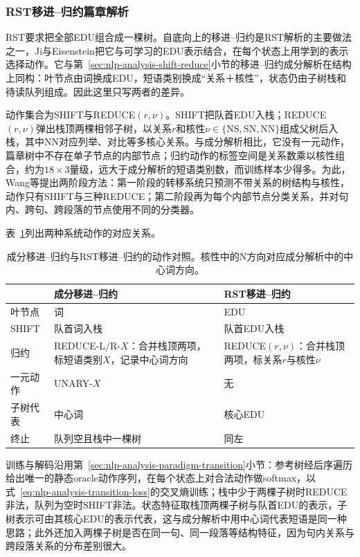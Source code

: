\subsubsection{RST移进--归约篇章解析}
\label{sec:nlp-analysis-rst-transition}

RST要求把全部EDU组合成一棵树。自底向上的移进--归约是RST解析的主要做法之一，Ji与Eisenstein把它与可学习的EDU表示结合，在每个状态上用学到的表示选择动作。它与第~\ref{sec:nlp-analysis-shift-reduce}小节的移进--归约成分解析在结构上同构：叶节点由词换成EDU，短语类别换成“关系＋核性”，状态仍由子树栈和待读队列组成。因此这里只写两者的差异。

动作集合为SHIFT与REDUCE$(r,\nu)$。SHIFT把队首EDU入栈；REDUCE$(r,\nu)$弹出栈顶两棵相邻子树，以关系$r$和核性$\nu\in\{\mathrm{NS},\mathrm{SN},\mathrm{NN}\}$组成父树后入栈，其中NN对应列举、对比等多核心关系。与成分解析相比，它没有一元动作，篇章树中不存在单子节点的内部节点；归约动作的标签空间是关系数乘以核性组合，约为$18\times3$量级，远大于成分解析的短语类别数，而训练样本少得多。为此，Wang等提出两阶段方法：第一阶段的转移系统只预测不带关系的树结构与核性，动作只有SHIFT与三种REDUCE；第二阶段再为每个内部节点分类关系，并对句内、跨句、跨段落的节点使用不同的分类器。

表~\ref{tab:nlp-analysis-rst-actions}列出两种系统动作的对应关系。

\begin{table}[htbp]
  \centering
  \small
  \begin{tabularx}{\linewidth}{@{}l XX@{}}
    \toprule
    & 成分移进--归约 & RST移进--归约\\
    \midrule
    叶节点 & 词 & EDU\\
    SHIFT & 队首词入栈 & 队首EDU入栈\\
    归约 & REDUCE-L/R-$X$：合并栈顶两项，标短语类别$X$，记录中心词方向 & REDUCE$(r,\nu)$：合并栈顶两项，标关系$r$与核性$\nu$\\
    一元动作 & UNARY-$X$ & 无\\
    子树代表 & 中心词 & 核心EDU\\
    终止 & 队列空且栈中一棵树 & 同左\\
    \bottomrule
  \end{tabularx}
  \caption{成分移进--归约与RST移进--归约的动作对照。核性中的N方向对应成分解析中的中心词方向。}
  \label{tab:nlp-analysis-rst-actions}
\end{table}

训练与解码沿用第~\ref{sec:nlp-analysis-paradigm-transition}小节：参考树经后序遍历给出唯一的静态oracle动作序列，在每个状态上对合法动作做softmax，以式~\eqref{eq:nlp-analysis-transition-loss}的交叉熵训练；栈中少于两棵子树时REDUCE非法，队列为空时SHIFT非法。状态特征取栈顶两棵子树与队首EDU的表示，子树表示可由其核心EDU的表示代表，这与成分解析中用中心词代表短语是同一种思路；此外还加入两棵子树是否在同一句、同一段落等结构特征，因为句内关系与跨段落关系的分布差别很大。

